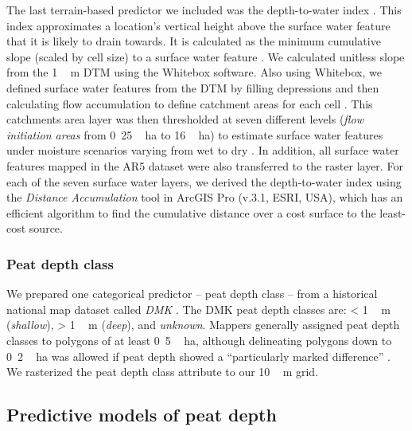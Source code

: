 \documentclass[soil, manuscript]{copernicus}
\begin{document}
The last terrain-based predictor we included was the depth-to-water index \citep{murphyMappingWetlandsComparison2007}.
This index approximates a location's vertical height above the surface water feature that it is likely to drain towards.
It is calculated as the minimum cumulative slope (scaled by cell size) to a surface water feature \citep[eq. 5 in][]{murphyTopographicModellingSoil2009}.
We calculated unitless slope from the \unit{1\,m} DTM using the Whitebox software.
Also using Whitebox, we defined surface water features from the DTM by filling depressions and then calculating flow accumulation to define catchment areas for each cell \citep{schonauerSpatiotemporalPredictionSoil2021, schonauerRcodeCalculatingDepthwater2021}.
This catchments area layer was then thresholded at seven different levels (\emph{flow initiation areas} from \unit{0.25\,ha} to \unit{16\,ha}) to estimate surface water features under moisture scenarios varying from wet to dry \citep{murphyModellingMappingTopographic2011, agrenEvaluatingDigitalTerrain2014, schonauerSpatiotemporalPredictionSoil2021}.
In addition, all surface water features mapped in the AR5 dataset were also transferred to the raster layer.
For each of the seven surface water layers, we derived the depth-to-water index using the \emph{Distance Accumulation} tool in ArcGIS Pro (v.3.1, ESRI, USA), which has an efficient algorithm to find the cumulative distance over a cost surface to the least-cost source.

\subsubsection{Peat depth class}

We prepared one categorical predictor -- peat depth class -- from a historical national map dataset called \emph{DMK} \citep{ahlstromAR5Klassifikasjonssystem2019}.
The DMK peat depth classes are: \textless{} \unit{1\,m} (\emph{shallow}), \textgreater{} \unit{1\,m} (\emph{deep}), and \emph{unknown}.
Mappers generally assigned peat depth classes to polygons of at least \unit{0.5\,ha}, although delineating polygons down to \unit{0.2\,ha} was allowed if peat depth showed a ``particularly marked difference'' \citep{bjordalMarkslagsklassifikasjonOkonomiskKartverk2007}.
We rasterized the peat depth class attribute to our \unit{10\,m} grid.

\subsection{Predictive models of peat depth}
\end{document}

